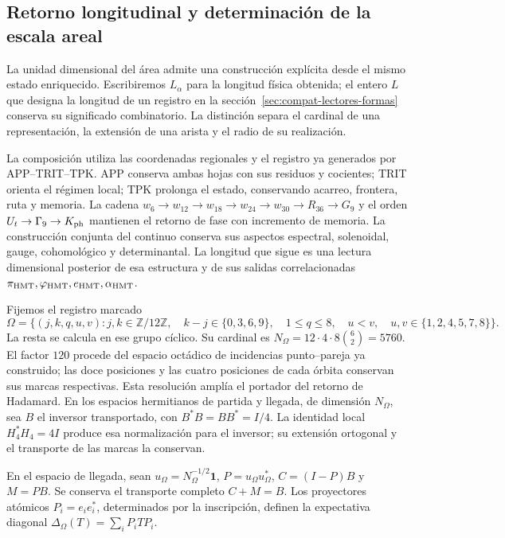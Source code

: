 \subsection{Retorno longitudinal y determinación de la escala areal}
\label{rev5:longitud}

La unidad dimensional del área admite una construcción explícita
desde el mismo estado enriquecido. Escribiremos \(L_\alpha\) para la
longitud física obtenida; el entero \(L\) que designa la longitud de un
registro en la sección~\ref{sec:compat-lectores-formas} conserva su
significado combinatorio. La distinción separa el cardinal de una
representación, la extensión de una arista y el radio de su realización.

La composición utiliza las coordenadas regionales y el registro ya
generados por APP--TRIT--TPK. APP conserva ambas hojas con sus residuos
y cocientes; TRIT orienta el régimen local; TPK prolonga el estado,
conservando acarreo, frontera, ruta y memoria. La cadena
\(w_6\to w_{12}\to w_{18}\to w_{24}\to w_{30}\to R_{36}\to G_9\)
y el orden \(U_t\to\Gamma_9\to K_{\rm ph}\) mantienen el
retorno de fase con incremento de memoria. La construcción conjunta
del continuo conserva sus aspectos espectral, solenoidal, gauge,
cohomológico y determinantal. La longitud que sigue es una lectura
dimensional posterior de esa estructura y de sus salidas correlacionadas
\(\pi_{\rm HMT},\varphi_{\rm HMT},e_{\rm HMT},\alpha_{\rm HMT}\).

Fijemos el registro marcado
\[
 \Omega=\{(j,k,q,u,v):j,k\in\mathbb Z/12\mathbb Z,\quad
 k-j\in\{0,3,6,9\},\quad1\le q\le8,\quad
 u<v,\quad u,v\in\{1,2,4,5,7,8\}\}.
\]
La resta se calcula en ese grupo cíclico. Su cardinal es
\(N_\Omega=12\cdot4\cdot8\binom62=5760\).
El factor \(120\) procede del espacio octádico de incidencias
punto--pareja ya construido; las doce posiciones y las cuatro
posiciones de cada órbita conservan sus marcas respectivas. Esta
resolución amplía el portador del retorno de Hadamard. En los espacios
hermitianos de partida y llegada, de dimensión \(N_\Omega\), sea
\(B\) el inversor transportado, con
\(B^*B=BB^*=I/4\). La identidad local
\(H_4^*H_4=4I\) produce esa normalización para el inversor;
su extensión ortogonal y el transporte de las marcas la conservan.

En el espacio de llegada, sean
\(u_\Omega=N_\Omega^{-1/2}\mathbf1\),
\(P=u_\Omega u_\Omega^*\), \(C=(I-P)B\) y \(M=PB\).
Se conserva el transporte completo \(C+M=B\). Los proyectores
atómicos \(P_i=e_ie_i^*\), determinados por la inscripción,
definen la expectativa diagonal
\(\Delta_\Omega(T)=\sum_iP_iTP_i\).

